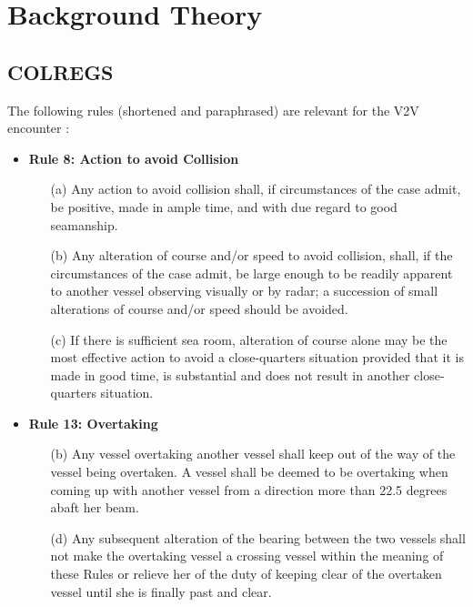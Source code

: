 
\chapter{Background Theory}\label{chap:background-theory}

\section{COLREGS}\label{sec:colregs}

The following rules (shortened and paraphrased) are relevant for the V2V encounter \citep{COLREGS}:

\begin{itemize}
    \item \textbf{Rule 8: Action to avoid Collision}
        \begin{enumerate}
            \item[(a)] Any action to avoid collision shall, if circumstances of the case admit, be positive, made in ample time, and with due regard to good seamanship.
            \item[(b)] Any alteration of course and/or speed to avoid collision, shall, if the circumstances of the case admit, be large enough to be readily apparent to another vessel observing visually or by radar; a succession of small alterations of course and/or speed should be avoided.
            \item[(c)] If there is sufficient sea room, alteration of course alone may be the most effective action to avoid
            a close-quarters situation provided that it is made in good time, is substantial and does not result in
            another close-quarters situation.
        \end{enumerate}
    \item \textbf{Rule 13: Overtaking }
        \begin{enumerate}
            \item[(b)] Any vessel overtaking another vessel shall keep out of the way of the vessel being overtaken. A vessel shall be deemed to be overtaking when coming up with another vessel from a direction more than 22.5 degrees abaft her beam.
            \item[(d)] Any subsequent alteration of the bearing between the two vessels shall not make the overtaking vessel a crossing vessel within the meaning of these Rules or relieve her of the duty of keeping clear of the overtaken vessel until she is finally past and clear.

\end{enumerate}
\end{itemize}
